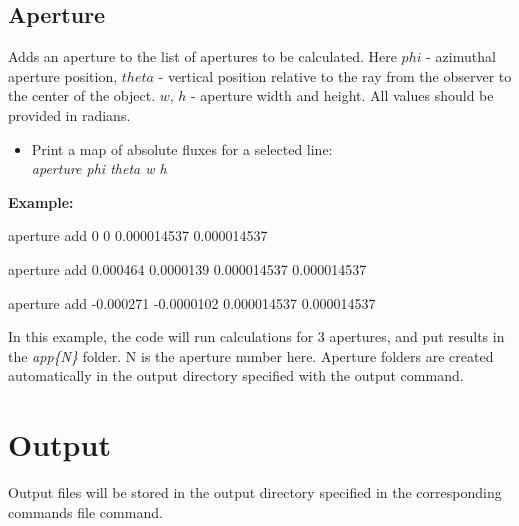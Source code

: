 \documentclass[a4paper]{article}
\begin{document}
\subsection{Aperture}

Adds an aperture to the list of apertures to be calculated.
Here $phi$ - azimuthal aperture position, $theta$ - vertical position relative to the ray
from the observer to the center of the object. $w$, $h$ - aperture width and height. All values
should be provided in radians.

\begin{itemize}
    \item Print a map of absolute fluxes for a selected line: \\
    \hspace*{0.25cm} {\it aperture phi theta w h}
\end{itemize}

{\bf Example:}
\vspace{0.25cm}

\hspace*{0.25cm} aperture add 0 0 0.000014537 0.000014537
\vspace{0.1cm}

\hspace*{0.25cm} aperture add 0.000464 0.0000139 0.000014537 0.000014537
\vspace{0.1cm}

\hspace*{0.25cm} aperture add -0.000271 -0.0000102 0.000014537 0.000014537
\vspace{0.1cm}

In this example, the code will run calculations for 3 apertures, and put results in the
{\it app\{N\}} folder.
N is the aperture number here. Aperture folders are created automatically
in the output directory specified with the output command.

\newpage

\section{Output}
Output files will be stored in the output directory specified in the corresponding commands file command.
\end{document}
